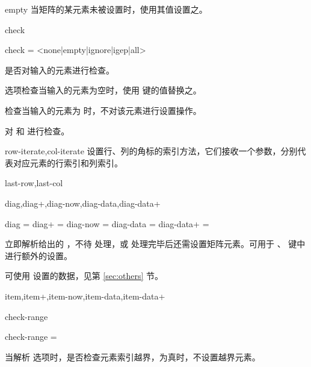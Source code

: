 \documentclass{ctxdoc}
\begin{document}
\begin{function}{empty}
    当矩阵的某元素未被设置时，使用其值设置之。
\end{function}

\begin{function}{check}
    \begin{syntax}
        check = <none|empty|ignore|igep|all>
    \end{syntax}
    是否对输入的元素进行检查。

     选项检查当输入的元素为空时，使用  键的值替换之。

     检查当输入的元素为  时，不对该元素进行设置操作。

     对  和  进行检查。
\end{function}

\begin{function}{row-iterate,col-iterate}
    设置行、列的角标的索引方法，它们接收一个参数，分别代表对应元素的行索引和列索引。
\end{function}

\begin{function}{last-row,last-col}
\end{function}

\begin{function}{diag,diag+,diag-now,diag-data,diag-data+}
    \begin{syntax}
        diag  = 
        diag+ = 
        diag-now = 
        diag-data  = 
        diag-data+ = 
    \end{syntax}
     立即解析给出的 ，不待  处理，或  处理完毕后还需设置矩阵元素。可用于 、 键中进行额外的设置。

     可使用  设置的数据，见第 \ref{sec:others} 节。
\end{function}

\begin{function}{item,item+,item-now,item-data,item-data+}
\end{function}

\begin{function}{check-range}
    \begin{syntax}
        check-range = \TTF {}
    \end{syntax}
    当解析  选项时，是否检查元素索引越界，为真时，不设置越界元素。
\end{function}
\end{document}
